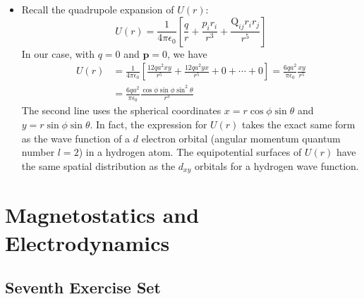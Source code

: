 \documentclass[11pt, a4paper]{article}
\renewcommand{\vec}[1]{\bm{#1}} %
\newcommand{\ee}{\epsilon_{0}}  %
\begin{document}
\begin{itemize}
	\item Recall the quadrupole expansion of $ U(r) $:
	\begin{equation*}
		U(r) = \frac{1}{4\pi \ee} \left[\frac{q}{r} + \frac{p_{i}r_{i}}{r^{3}} + \frac{\mathrm{Q}_{ij}r_{i}r_{j}}{r^{5}} \right]
	\end{equation*}
	In our case, with $ q = 0 $ and $ \vec{p} = 0 $, we have
	\begin{align*}
		U(r) &= \frac{1}{4\pi \ee} \left[\frac{12qa^{2}xy}{r^{5}} + \frac{12qa^{2}yx}{r^{5}} + 0 + \cdots + 0\right] = \frac{6qa^{2}}{\pi \ee} \frac{xy}{r^{5}}\\
		&=\frac{6qa^{2}}{\pi \ee} \frac{\cos \phi \sin \phi \sin^{2}\theta}{r^{3}}
	\end{align*}
	The second line uses the spherical coordinates $ x = r\cos \phi \sin \theta $ and $ y = r\sin \phi \sin \theta $. In fact, the expression for $ U(r) $ takes the exact same form as the wave function of a $ d $ electron orbital (angular momentum quantum number $ l = 2 $) in a hydrogen atom. The equipotential surfaces of $ U(r) $ have the same spatial distribution as the $ d_{xy} $  orbitals for a hydrogen wave function. 
	
\end{itemize}

\newpage

\section{Magnetostatics and Electrodynamics}

\subsection{Seventh Exercise Set}
\end{document}
